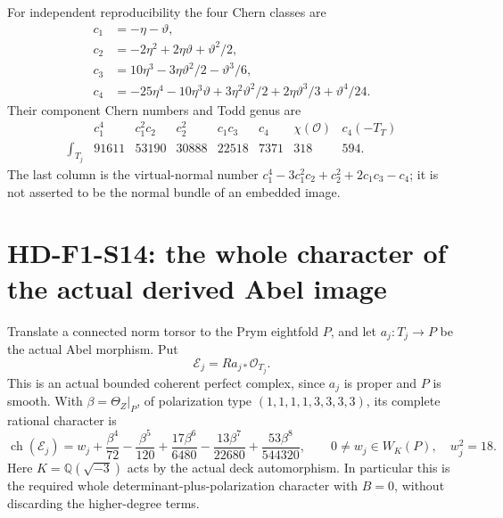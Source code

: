 For independent reproducibility the four Chern classes are
\[
\begin{aligned}
 c_1&=-\eta-\vartheta,\\
 c_2&=-2\eta^2+2\eta\vartheta+\vartheta^2/2,\\
 c_3&=10\eta^3-3\eta\vartheta^2/2-\vartheta^3/6,\\
 c_4&=-25\eta^4-10\eta^3\vartheta+3\eta^2\vartheta^2/2
                         +2\eta\vartheta^3/3+\vartheta^4/24.
\end{aligned}
 \tag{F1S13.9}
\]
Their component Chern numbers and Todd genus are
\[
\begin{array}{c|rrrrrrr}
 &c_1^4&c_1^2c_2&c_2^2&c_1c_3&c_4&\chi(\mathcal O)&c_4(-T_T)\\\hline
 \displaystyle\int_{T_j}&91611&53190&30888&22518&7371&318&594.
\end{array}
 \tag{F1S13.10}
\]
The last column is the virtual-normal number
$c_1^4-3c_1^2c_2+c_2^2+2c_1c_3-c_4$; it is not asserted to be the normal
bundle of an embedded image.

\section{HD-F1-S14: the whole character of the actual derived Abel image}
\label{sec:f1-norm-fourfold-character}

Translate a connected norm torsor to the Prym eightfold $P$, and let
$a_j:T_j\to P$ be the actual Abel morphism. Put
\[
                    \mathcal E_j=Ra_{j*}\mathcal O_{T_j}.
 \tag{F1S14.1}
\]
This is an actual bounded coherent perfect complex, since $a_j$ is
proper and $P$ is smooth. With $\beta=\Theta_Z|_P$, of polarization type
$(1,1,1,1,3,3,3,3)$, its complete rational character is
\[
 \operatorname{ch}(\mathcal E_j)=w_j+\frac{\beta^4}{72}
       -\frac{\beta^5}{120}+\frac{17\beta^6}{6480}
       -\frac{13\beta^7}{22680}+\frac{53\beta^8}{544320},
 \qquad 0\ne w_j\in W_K(P),\quad w_j^2=18.
 \tag{F1S14.2}
\]
Here $K=\mathbb Q(\sqrt{-3})$ acts by the actual deck automorphism.
In particular this is the required whole determinant-plus-polarization
character with $B=0$, without discarding the higher-degree terms.

